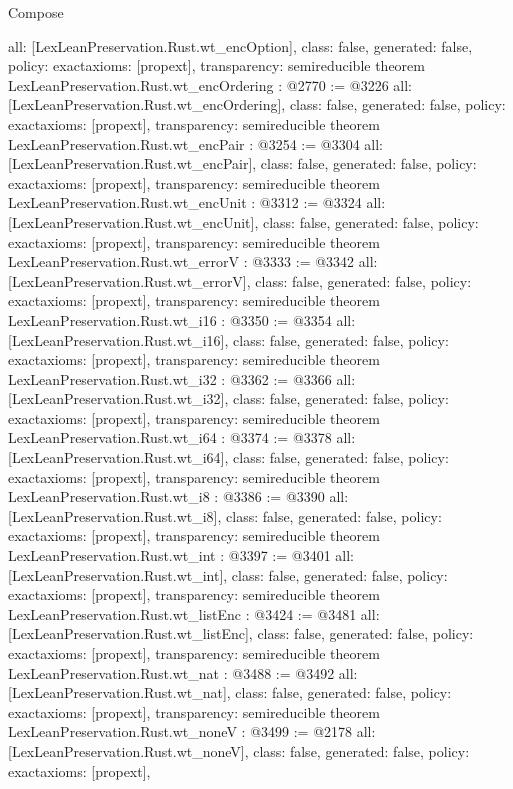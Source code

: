 \begin{lexlean}{Compose}
\begin{coremodule}
{  all: [LexLeanPreservation.Rust.wt_encOption],
  class: false,
  generated: false,
  policy: exact{axioms: [propext]},
  transparency: semireducible
}
theorem LexLeanPreservation.Rust.wt_encOrdering : @2770 := @3226 {
  all: [LexLeanPreservation.Rust.wt_encOrdering],
  class: false,
  generated: false,
  policy: exact{axioms: [propext]},
  transparency: semireducible
}
theorem LexLeanPreservation.Rust.wt_encPair : @3254 := @3304 {
  all: [LexLeanPreservation.Rust.wt_encPair],
  class: false,
  generated: false,
  policy: exact{axioms: [propext]},
  transparency: semireducible
}
theorem LexLeanPreservation.Rust.wt_encUnit : @3312 := @3324 {
  all: [LexLeanPreservation.Rust.wt_encUnit],
  class: false,
  generated: false,
  policy: exact{axioms: [propext]},
  transparency: semireducible
}
theorem LexLeanPreservation.Rust.wt_errorV : @3333 := @3342 {
  all: [LexLeanPreservation.Rust.wt_errorV],
  class: false,
  generated: false,
  policy: exact{axioms: [propext]},
  transparency: semireducible
}
theorem LexLeanPreservation.Rust.wt_i16 : @3350 := @3354 {
  all: [LexLeanPreservation.Rust.wt_i16],
  class: false,
  generated: false,
  policy: exact{axioms: [propext]},
  transparency: semireducible
}
theorem LexLeanPreservation.Rust.wt_i32 : @3362 := @3366 {
  all: [LexLeanPreservation.Rust.wt_i32],
  class: false,
  generated: false,
  policy: exact{axioms: [propext]},
  transparency: semireducible
}
theorem LexLeanPreservation.Rust.wt_i64 : @3374 := @3378 {
  all: [LexLeanPreservation.Rust.wt_i64],
  class: false,
  generated: false,
  policy: exact{axioms: [propext]},
  transparency: semireducible
}
theorem LexLeanPreservation.Rust.wt_i8 : @3386 := @3390 {
  all: [LexLeanPreservation.Rust.wt_i8],
  class: false,
  generated: false,
  policy: exact{axioms: [propext]},
  transparency: semireducible
}
theorem LexLeanPreservation.Rust.wt_int : @3397 := @3401 {
  all: [LexLeanPreservation.Rust.wt_int],
  class: false,
  generated: false,
  policy: exact{axioms: [propext]},
  transparency: semireducible
}
theorem LexLeanPreservation.Rust.wt_listEnc : @3424 := @3481 {
  all: [LexLeanPreservation.Rust.wt_listEnc],
  class: false,
  generated: false,
  policy: exact{axioms: [propext]},
  transparency: semireducible
}
theorem LexLeanPreservation.Rust.wt_nat : @3488 := @3492 {
  all: [LexLeanPreservation.Rust.wt_nat],
  class: false,
  generated: false,
  policy: exact{axioms: [propext]},
  transparency: semireducible
}
theorem LexLeanPreservation.Rust.wt_noneV : @3499 := @2178 {
  all: [LexLeanPreservation.Rust.wt_noneV],
  class: false,
  generated: false,
  policy: exact{axioms: [propext]},
}
\end{coremodule}
\end{lexlean}
